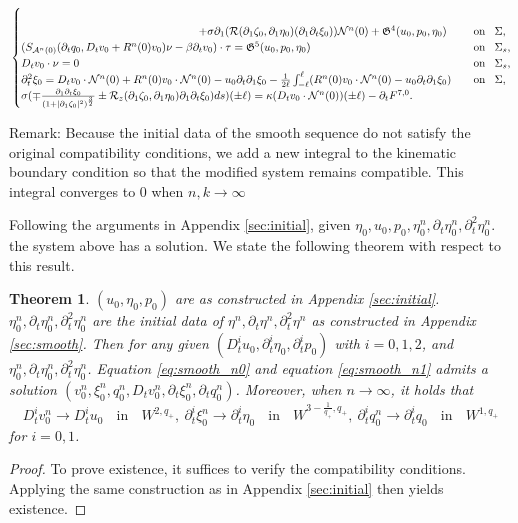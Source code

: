 \documentclass[letterpaper,reqno,10pt,twoside]{amsart}
\newtheorem{theorem}{Theorem}[section]
\theoremstyle{definition}
\theoremstyle{remark}
\def\p{\partial}
\begin{document}
\begin{appendix}
\begin{align}{\label{eq:smooth_n1}}
\begin{cases}
					\\
					~~~~~~~~~~~~~~~~~~~~~~~~~~~~~~~~~~~~~~~~~~~~~~~~+\sigma\partial_{1}(\mathcal{R}(\partial_{1}\zeta_{0},\partial_{1}\eta_{0})(\partial_{1}\p_{t}\xi_{0}))\mathcal{N}^{n}(0)+\mathfrak{G}^{4}(u_{0},p_{0},\eta_{0})~~~&\operatorname{on}~~\Sigma,\\
					(S_{\mathcal{A}^{n}(0)}(\p_{t}q_{0},D_{t}v_{0}+R^{n}(0)v_{0})\nu-\beta \p_{t}v_{0})\cdot \tau=\mathfrak{G}^{5}(u_{0},p_{0},\eta_{0})~~~&\operatorname{on}~~\Sigma_{s},\\
					D_{t}v_{0}\cdot \nu=0~~~&\operatorname{on}~~\Sigma_{s},\\
					\partial_{t}^{2}\xi_{0}=D_{t}v_{0}\cdot \mathcal{N}^{n}(0)+R^{n}(0)v_{0}\cdot \mathcal{N}^{n}(0)-u_{0}\p_{t}\p_{1}\xi_{0}-\frac{1}{2\ell}\int_{-\ell}^{\ell}(R^{n}(0)v_{0}\cdot \mathcal{N}^{n}(0)-u_{0}\p_{t}\p_{1}\xi_{0})~~~&\operatorname{on}~~\Sigma,\\
					\sigma(\mp \frac{\partial_{1}\p_{t}\xi_{0}}{(1+\vert \partial_{1}\zeta_{0}\vert^{2})^{\frac{3}{2}}}\pm \mathcal{R}_{z}(\partial_{1}\zeta_{0},\partial_{1}\eta_{0})\partial_{1}\p_{t}\xi_{0})ds)(\pm\ell)=\kappa (D_{t}v_{0}\cdot \mathcal{N}^{n}(0))(\pm \ell)-\p_{t}{F}^{7,0}.
				\end{cases}
			\end{align}
			
			Remark: Because the initial data of the smooth sequence do not satisfy the original compatibility conditions, we add a new integral to the kinematic boundary condition so that the modified system remains compatible. 
			This integral converges to $0$ when $n,k\rightarrow \infty$
			
			Following the arguments in Appendix \ref{sec:initial}, given $\eta_{0},u_{0},p_{0},\eta_{0}^{n},\p_{t}\eta_{0}^{n},\p_{t}^{2}\eta_{0}^{n}$. the system above has a solution. We state the following theorem with respect to this result.
			\begin{theorem}{\label{thm:initial_n}}
				$(u_{0},\eta_{0},p_{0})$ are as constructed in Appendix \ref{sec:initial}. $\eta_{0}^{n},\p_{t}\eta_{0}^{n},\p_{t}^{2}\eta_{0}^{n}$ are the initial data of $\eta^{n},\p_{t}\eta^{n},\p_{t}^{2}\eta^{n}$ as constructed in Appendix \ref{sec:smooth}. Then for any given $(D_{t}^{i}u_{0},\p_{t}^{i}\eta_{0},\p_{t}^{i}p_{0})$ with $i=0,1,2$, and $\eta_{0}^{n},\p_{t}\eta_{0}^{n},\p_{t}^{2}\eta_{0}^{n}$. Equation \eqref{eq:smooth_n0} and equation \eqref{eq:smooth_n1} admits a solution $(v^{n}_{0},\xi_{0}^{n},q_{0}^{n},D_{t}v_{0}^{n},\p_{t}\xi_{0}^{n},\p_{t}q_{0}^{n})$. Moreover, when $n\rightarrow \infty$, it holds that
				\[
				D_{t}^{i}v_{0}^{n}\rightarrow D_{t}^{i}u_{0}~~~\operatorname{in}~~~W^{2,q_{+}},\
				\p_{t}^{i}\xi_{0}^{n}\rightarrow \p_{t}^{i}\eta_{0}~~~\operatorname{in}~~~W^{3-\frac{1}{q_{+}},q_{+}},\
				\p_{t}^{i}q_{0}^{n}\rightarrow \p_{t}^{i}q_{0}~~~\operatorname{in}~~~W^{1,q_{+}}
				\]
				for $i=0,1$.
			\end{theorem}
			\begin{proof}
				To prove existence, it suffices to verify the compatibility conditions. Applying the same construction as in Appendix \ref{sec:initial} then yields existence.
				

\end{proof}
\end{appendix}
\end{document}
